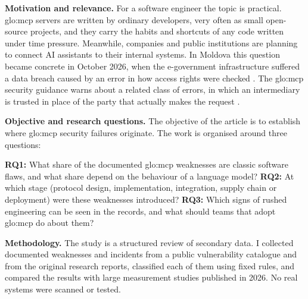 \par \textbf{Motivation and relevance.} For a software engineer the topic is practical. \acrshort{glo:mcp} servers are written by ordinary developers, very often as small open-source projects, and they carry the habits and shortcuts of any code written under time pressure. Meanwhile, companies and public institutions are planning to connect AI assistants to their internal systems. In Moldova this question became concrete in October 2026, when the e-government infrastructure suffered a data breach caused by an error in how access rights were checked \cite{tv82026}. The \acrshort{glo:mcp} security guidance warns about a related class of errors, in which an intermediary is trusted in place of the party that actually makes the request \cite{mcpsecbp}.

\par \textbf{Objective and research questions.} The objective of the article is to establish where \acrshort{glo:mcp} security failures originate. The work is organised around three questions:
\begin{itemize}
    \hitem \textbf{RQ1:} What share of the documented \acrshort{glo:mcp} weaknesses are classic software flaws, and what share depend on the behaviour of a language model?
    \hitem \textbf{RQ2:} At which stage (protocol design, implementation, integration, supply chain or deployment) were these weaknesses introduced?
    \hitem \textbf{RQ3:} Which signs of rushed engineering can be seen in the records, and what should teams that adopt \acrshort{glo:mcp} do about them?
\end{itemize}

\par \textbf{Methodology.} The study is a structured review of secondary data. I collected \nRecords{} documented weaknesses and incidents from a public vulnerability catalogue and from the original research reports, classified each of them using fixed rules, and compared the results with large measurement studies published in 2026. No real systems were scanned or tested.
